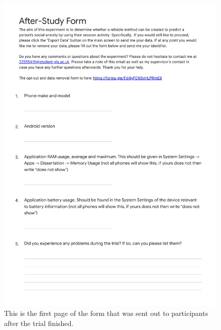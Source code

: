 \documentclass{l4proj}
\begin{document}
\begin{appendices}
\begin{figure}[htb]
    \includegraphics[width=\textwidth]{images/device_form_1.pdf}
    \caption{This is the first page of the form that was sent out to participants after the trial finished.}
    \label{fig:device_form1}
\end{figure}


\end{appendices}
\end{document}
